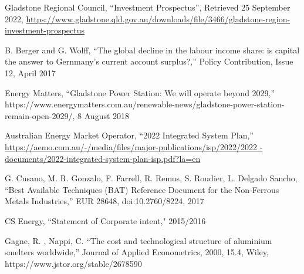 \documentclass[12pt,a4paper]{article}
\begin{document}
\begin{thebibliography}{1}
  Gladstone Regional Council, ``Investment Prospectus'', Retrieved 25 September
    2022,
    \url{https://www.gladstone.qld.gov.au/downloads/file/3466/gladstone-region-investment-prospectus}

B. Berger and G. Wolff, “The global decline in the labour income share: is
capital the answer to Gernmany’s current account surplus?,” Policy Contribution,
Issue 12, April 2017

 Energy Matters, “Gladstone Power Station: We will operate
  beyond 2029,”
  https://www.energymatters.com.au/renewable-news/gladstone-power-station-remain-open-2029/,
  8 August 2018

 Australian Energy Market Operator, “2022 Integrated System
  Plan,”
    \url{https://aemo.com.au/-/media/files/major-publications/isp/2022/2022
    -documents/2022-integrated-system-plan-isp.pdf?la=en}

 G. Cusano, M. R. Gonzalo, F. Farrell, R. Remus, S. Roudier, L.
  Delgado Sancho,   “Best Available Techniques (BAT) Reference Document for the
    Non-Ferrous Metals Industries,” EUR 28648, doi:10.2760/8224, 2017

  CS Energy, ``Statement of Corporate intent," 2015/2016

  Gagne, R. , Nappi, C.  ``The cost and technological structure of aluminium
    smelters worldwide,'' Journal of Applied Econometrics, 2000, 15.4, Wiley,
    https://www.jstor.org/stable/2678590


  

\end{thebibliography}
\end{document}
